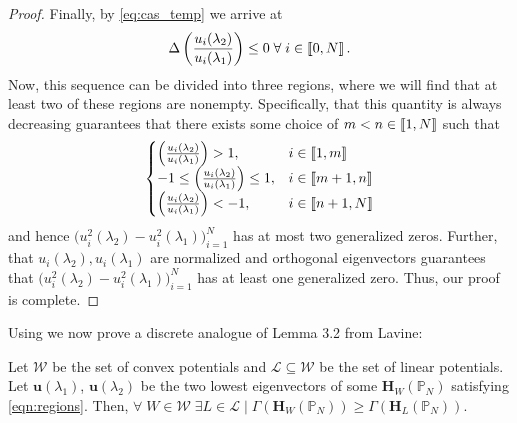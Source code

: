 \begin{proof}
    Finally, by \cref{eq:cas_temp} we arrive at
    \begin{equation}
      \Delta\left(\frac{u_i(\lambda_2)}{u_i(\lambda_1)} \right)\leq 0 \; \forall \; i \in \left \llbracket 0 , N \right \rrbracket.
    \end{equation}
    Now, this sequence can be divided into three regions, where we will find that at least two of these regions are nonempty. Specifically, that this quantity is always decreasing guarantees that there exists some choice of $m < n \in \left \llbracket 1 , N \right \rrbracket$ such that
    \begin{equation}\label{eqn:regions}
      \begin{cases}
    	\left(\frac{u_i(\lambda_2)}{u_i(\lambda_1)} \right) > 1, & i \in \left \llbracket 1 , m \right \rrbracket \\
    	-1 \leq \left(\frac{u_i(\lambda_2)}{u_i(\lambda_1)} \right) \leq 1, & i \in \left \llbracket m+1 , n \right \rrbracket \\
    	\left(\frac{u_i(\lambda_2)}{u_i(\lambda_1)} \right) < -1, & i \in \left \llbracket n+1 , N \right \rrbracket
      \end{cases}
    \end{equation}
    and hence $\big(u_{i}^2(\lambda_2) - u_{i}^2(\lambda_1)\big)_{i=1}^N$ has at most two generalized zeros. Further, that $u_{i}(\lambda_2),u_{i}(\lambda_1)$ are normalized and orthogonal eigenvectors guarantees that $\big(u_{i}^2(\lambda_2) - u_{i}^2(\lambda_1)\big)_{i=1}^N$ has at least one generalized zero. Thus, our proof is complete.
  \end{proof}

  Using  we now prove a discrete analogue of Lemma 3.2 from Lavine\cite{Lavine1994}:
  \begin{lem}\label{lem:lavine}
	Let $\mathcal{W}$ be the set of convex potentials and $\mathcal{L}\subseteq{\mathcal{W}}$ be the set of linear potentials. Let $\mathbf{u}(\lambda_1)$, $\mathbf{u}(\lambda_2)$ be the two lowest eigenvectors of some $\mathbf{H}_{W}(\mathbb{P}_N)$ satisfying \cref{eqn:regions}.  Then, $\forall \;W\in\mathcal{W} \; \exists L \in \mathcal{L} \;\rvert\; \Gamma(\mathbf{H}_{W}(\mathbb{P}_N)) \geq \Gamma(\mathbf{H}_{L}(\mathbb{P}_N))$.
  \end{lem}

